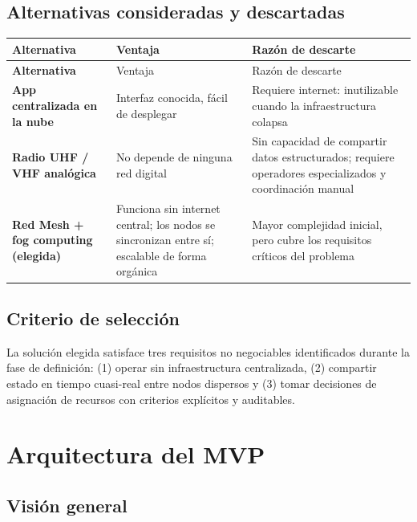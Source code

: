 \documentclass[12pt,a4paper]{article}
\begin{document}
\subsection{Alternativas consideradas y descartadas}

\begin{longtable}{>{\bfseries}p{3.5cm} p{5cm} p{5cm}}
  \toprule
  Alternativa & Ventaja & Razón de descarte \\
  \midrule
  \endfirsthead
  \toprule
  Alternativa & Ventaja & Razón de descarte \\
  \midrule
  \endhead
  App centralizada en la nube &
    Interfaz conocida, fácil de desplegar &
    Requiere internet: inutilizable cuando la infraestructura colapsa \\[4pt]
  Radio UHF / VHF analógica &
    No depende de ninguna red digital &
    Sin capacidad de compartir datos estructurados; requiere operadores
    especializados y coordinación manual \\[4pt]
  \textbf{Red Mesh + fog computing} (elegida) &
    Funciona sin internet central; los nodos se sincronizan entre sí;
    escalable de forma orgánica &
    Mayor complejidad inicial, pero cubre los requisitos críticos del
    problema \\
  \bottomrule
\end{longtable}

\subsection{Criterio de selección}

La solución elegida satisface tres requisitos no negociables identificados
durante la fase de definición: (1) operar sin infraestructura centralizada,
(2) compartir estado en tiempo cuasi-real entre nodos dispersos y (3) tomar
decisiones de asignación de recursos con criterios explícitos y auditables.

\section{Arquitectura del MVP}

\subsection{Visión general}
\end{document}
